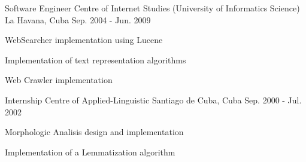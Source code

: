 \begin{cventries}

\cventry
{Software Engineer} %
{Centre of Internet Studies (University of Informatics Science)} %
{La Havana, Cuba} %
{Sep. 2004 - Jun. 2009} %
{ %
\begin{cvitems}
\item {WebSearcher implementation using Lucene}
\item {Implementation of text representation algorithms}
\item {Web Crawler implementation}
\end{cvitems} 
}


\cventry
{Internship} %
{Centre of Applied-Linguistic} %
{Santiago de Cuba, Cuba} %
{Sep. 2000 - Jul. 2002} %
{ %
\begin{cvitems}
\item {Morphologic Analisis design and implementation}
\item {Implementation of a Lemmatization algorithm}
\end{cvitems}
}


\end{cventries}

